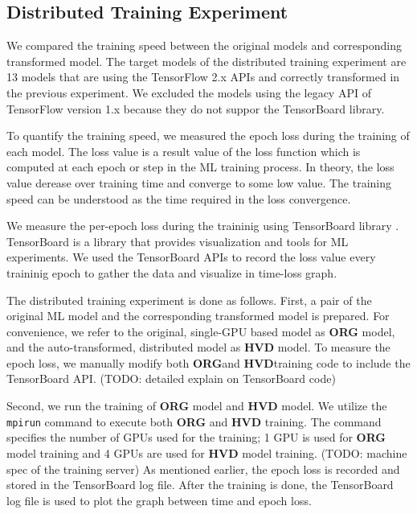 \subsection{Distributed Training Experiment}

We compared the training speed between the original models and
corresponding transformed model. 
The target models of the distributed training experiment are 
13 models that are using the TensorFlow 2.x APIs and correctly
transformed in the previous experiment.
We excluded the models using the legacy API of
TensorFlow version 1.x because they do not suppor the TensorBoard library. 

To quantify the training speed, we measured the epoch loss during the training
of each model.
The loss value is a result value of the loss function which is computed
at each epoch or step in the ML training process.
In theory, the loss value derease over training time and converge
to some low value.
The training speed can be understood as the time required in the
loss convergence.

We measure the per-epoch loss during the traininig using
TensorBoard library \cite{tensorboard}. 
TensorBoard is a library that provides visualization and tools
for ML experiments.
We used the TensorBoard APIs to record the loss value every traininig epoch
to gather the data and visualize in time-loss graph.

\newcommand{\orgbf}{\textbf{ORG}}
\newcommand{\hvdbf}{\textbf{HVD}}

The distributed training experiment is done as follows.
First, a pair of the original ML model and the corresponding transformed model
is prepared. For convenience, we refer to the original, single-GPU based model
as \textbf{ORG} model, and the auto-transformed, distributed model as
\textbf{HVD} model. To measure the epoch loss, we manually modify both  
\orgbf and \hvdbf training code to include the TensorBoard API. 
(TODO: detailed explain on TensorBoard code)

Second, we run the training of \textbf{ORG} model and
\textbf{HVD} model. We utilize the {\tt mpirun} command to execute both
\textbf{ORG} and \textbf{HVD} training. The command specifies the number of
GPUs used for the training; 1 GPU is used for \textbf{ORG} model training  
and 4 GPUs are used for \textbf{HVD} model training. 
(TODO: machine spec of the training server)
As mentioned earlier, the epoch loss is recorded and stored in the
TensorBoard log file.
After the training is done, the TensorBoard log file is used to plot the
graph between time and epoch loss. 

